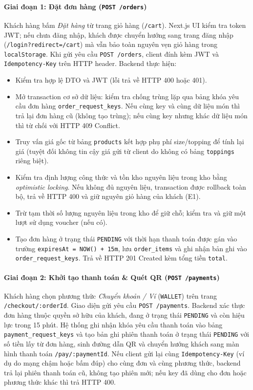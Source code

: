 \paragraph{Giai đoạn 1: Đặt đơn hàng (\texttt{POST /orders})}
Khách hàng bấm \emph{Đặt hàng} từ trang giỏ hàng (\texttt{/cart}). Next.js UI kiểm tra token JWT; nếu chưa đăng nhập, khách được chuyển hướng sang trang đăng nhập (\texttt{/login?redirect=/cart}) mà vẫn bảo toàn nguyên vẹn giỏ hàng trong \texttt{localStorage}.
Khi gửi yêu cầu \texttt{POST /orders}, client đính kèm JWT và \texttt{Idempotency-Key} trên HTTP header.
Backend thực hiện:
\begin{itemize}
  \item Kiểm tra hợp lệ DTO và JWT (lỗi trả về HTTP 400 hoặc 401).
  \item Mở transaction cơ sở dữ liệu: kiểm tra chống trùng lặp qua bảng khóa yêu cầu đơn hàng \texttt{order\_request\_keys}. Nếu cùng key và cùng dữ liệu món thì trả lại đơn hàng cũ (không tạo trùng); nếu cùng key nhưng khác dữ liệu món thì từ chối với HTTP 409 Conflict.
  \item Truy vấn giá gốc từ bảng \texttt{products} kết hợp phụ phí size/topping để tính lại giá (tuyệt đối không tin cậy giá gửi từ client do không có bảng \texttt{toppings} riêng biệt).
  \item Kiểm tra định lượng công thức và tồn kho nguyên liệu trong kho bằng \emph{optimistic locking}. Nếu không đủ nguyên liệu, transaction được rollback toàn bộ, trả về HTTP 400 và giữ nguyên giỏ hàng của khách (E1).
  \item Trừ tạm thời số lượng nguyên liệu trong kho để giữ chỗ; kiểm tra và giữ một lượt sử dụng voucher (nếu có).
  \item Tạo đơn hàng ở trạng thái \texttt{PENDING} với thời hạn thanh toán được gán vào trường \texttt{expiresAt = NOW() + 15m}, lưu \texttt{order\_items} và ghi nhận bản ghi vào \texttt{order\_request\_keys}. Trả về HTTP 201 Created kèm tổng tiền \texttt{total}.
\end{itemize}

\paragraph{Giai đoạn 2: Khởi tạo thanh toán \& Quét QR (\texttt{POST /payments})}
Khách hàng chọn phương thức \emph{Chuyển khoản / Ví} (\texttt{WALLET}) trên trang \texttt{/checkout/:orderId}. Giao diện gửi yêu cầu \texttt{POST /payments}. Backend xác thực đơn hàng thuộc quyền sở hữu của khách, đang ở trạng thái \texttt{PENDING} và còn hiệu lực trong 15 phút. Hệ thống ghi nhận khóa yêu cầu thanh toán vào bảng \texttt{payment\_request\_keys} và tạo bản ghi phiên thanh toán ở trạng thái \texttt{PENDING} với số tiền lấy từ đơn hàng, sinh đường dẫn QR và chuyển hướng khách sang màn hình thanh toán \texttt{/pay/:paymentId}.
Nếu client gửi lại cùng \texttt{Idempotency-Key} (ví dụ do mạng chậm hoặc bấm đúp) cho cùng đơn và cùng phương thức, backend trả lại phiên thanh toán cũ, không tạo phiên mới; nếu key đã dùng cho đơn hoặc phương thức khác thì trả HTTP 400.

